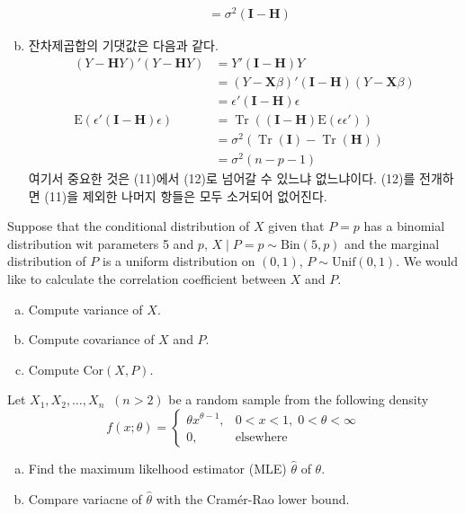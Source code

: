 \documentclass[answers]{exam}
\DeclareMathOperator{\Tr}{Tr}
\begin{document}
\begin{questions}
\begin{solution}
\begin{enumerate}[(a)]
\begin{align}
          &=\sigma^{2}\left(\mathbf{I}-\mathbf{H}\right)
        \end{align}
        \item 잔차제곱합의 기댓값은 다음과 같다.
        \begin{align}
          \left(Y-\mathbf{H}Y\right)'\left(Y-\mathbf{H}Y\right) &= Y'\left(\mathbf{I}-\mathbf{H}\right)Y\\
          &= \left(Y-\mathbf{X}\beta\right)'\left(\mathbf{I}-\mathbf{H}\right)\left(Y-\mathbf{X}\beta\right)\\
          &= \epsilon'\left(\mathbf{I}-\mathbf{H}\right)\epsilon\\
          \mathrm{E}\left(\epsilon'\left(\mathbf{I}-\mathbf{H}\right)\epsilon\right) &= \Tr\left(\left(\mathbf{I}-\mathbf{H}\right)\mathrm{E}\left(\epsilon\epsilon'\right)\right)\\
          &=\sigma^{2}\left(\Tr\left(\mathbf{I}\right)-\Tr\left(\mathbf{H}\right)\right)\\
          &= \sigma^{2}\left(n-p-1\right)
        \end{align}
        여기서 중요한 것은 (11)에서 (12)로 넘어갈 수 있느냐 없느냐이다. (12)를 전개하면 (11)을 제외한 나머지 항들은 모두 소거되어 없어진다.
      \end{enumerate}
    \end{solution}
    \question
    Suppose that the conditional distribution of $X$ given that $P=p$ has a binomial distribution wit parameters 5 and $p$, $X\;|\;P=p \sim \mathrm{Bin}\left(5,p\right)$ and the marginal distribution of $P$ is a uniform distribution on $(0,1)$, $P\sim \mathrm{Unif}\left(0,1\right)$. We would like to calculate the correlation coefficient between $X$ and $P$.
    \begin{enumerate}[(a)]
      \item Compute variance of $X$.
      \item Compute covariance of $X$ and $P$.
      \item Compute $\mathrm{Cor}\left(X,P\right)$.
    \end{enumerate}
    \begin{solution}

    \end{solution}
    \question
    Let $X_{1},X_{2},\ldots,X_{n}\;\;\left(n>2\right)$ be a random sample from the following density
    $$
      f\left(x;\theta\right)=\begin{cases}\theta x^{\theta-1}, & 0<x<1,\;0<\theta<\infty \\ 0, & \text{elsewhere}\end{cases}
    $$
    \begin{enumerate}[(a)]
      \item Find the maximum likelhood estimator (MLE) $\widehat{\theta}$ of $\theta$.
      \item Compare variacne of $\widehat{\theta}$ with the Cramér-Rao lower bound.
    \end{enumerate}
    \begin{solution}


\end{solution}
\end{questions}
\end{document}
